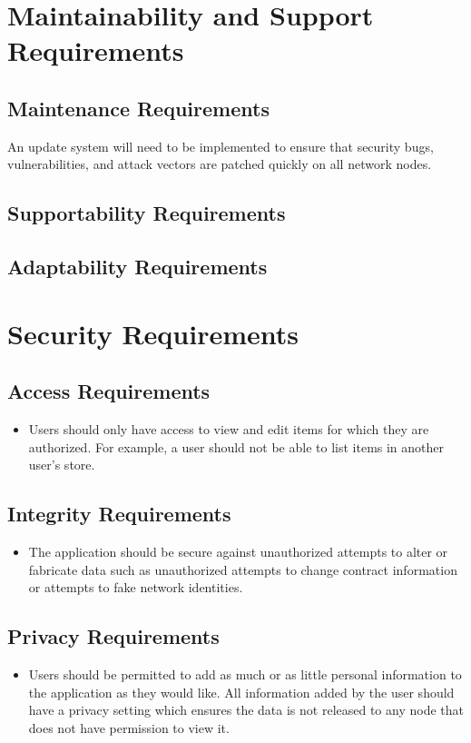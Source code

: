 \documentclass{article}
\begin{document}
\section{Maintainability and Support Requirements}

\subsection{Maintenance Requirements}
An update system will need to be implemented to ensure that security bugs, vulnerabilities, and attack vectors are patched quickly on all network nodes. 

\subsection{Supportability Requirements}


\subsection{Adaptability Requirements}

\section{Security Requirements}

\subsection{Access Requirements}
\begin{itemize}
	\item 
	Users should only have access to view and edit items for which they are authorized. For example, a user should not be able to list items in another user's store.   	
\end{itemize}

\subsection{Integrity Requirements}
\begin{itemize}
	\item 
	The application should be secure against unauthorized attempts to alter or fabricate data such as unauthorized attempts to change contract information or attempts to fake network identities.   	
\end{itemize}

\subsection{Privacy Requirements}
\begin{itemize}
	\item 
	Users should be permitted to add as much or as little personal information to the application as they would like. All information added by the user should have a privacy setting which ensures the data is not released to any node that does not have permission to view it.   	
\end{itemize}
\end{document}
